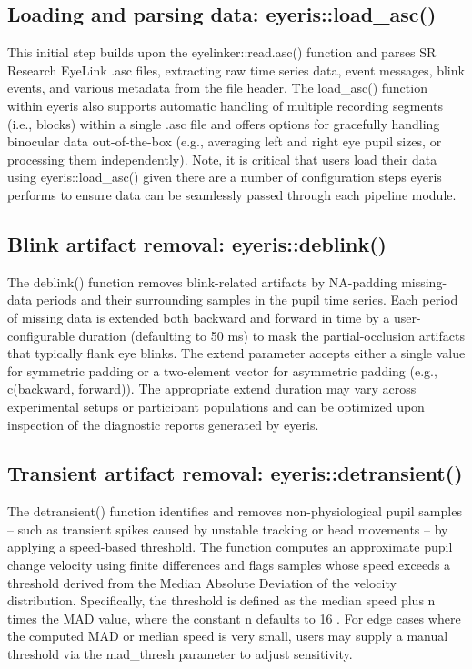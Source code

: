 \subsection{Loading and parsing data: eyeris::load\_asc()}
This initial step builds upon the eyelinker::read.asc() function and parses SR Research EyeLink .asc files, extracting raw time series data, event messages, blink events, and various metadata from the file header. The load\_asc() function within eyeris also supports automatic handling of multiple recording segments (i.e., blocks) within a single .asc file and offers options for gracefully handling binocular data out-of-the-box (e.g., averaging left and right eye pupil sizes, or processing them independently). Note, it is critical that users load their data using eyeris::load\_asc() given there are a number of configuration steps eyeris performs to ensure data can be seamlessly passed through each pipeline module.

\subsection{Blink artifact removal: eyeris::deblink()}
The deblink() function removes blink-related artifacts by NA-padding missing-data periods and their surrounding samples in the pupil time series. Each period of missing data is extended both backward and forward in time by a user-configurable duration (defaulting to 50 ms) to mask the partial-occlusion artifacts that typically flank eye blinks. The extend parameter accepts either a single value for symmetric padding or a two-element vector for asymmetric padding (e.g., c(backward, forward)). The appropriate extend duration may vary across experimental setups or participant populations and can be optimized upon inspection of the diagnostic reports generated by eyeris.

\subsection{Transient artifact removal: eyeris::detransient()}
The detransient() function identifies and removes non-physiological pupil samples – such as transient spikes caused by unstable tracking or head movements – by applying a speed-based threshold. The function computes an approximate pupil change velocity using finite differences and flags samples whose speed exceeds a threshold derived from the Median Absolute Deviation \parencite[MAD;][]{arachchige2024confidence,hampel1968contributions,hampel1974influence,leys2013detecting,rousseeuw1993alternatives,rousseeuw1986robust} of the velocity distribution. Specifically, the threshold is defined as the median speed plus n times the MAD value, where the constant n defaults to 16 \parencite{tsukahara2020pupillometry}. For edge cases where the computed MAD or median speed is very small, users may supply a manual threshold via the mad\_thresh parameter to adjust sensitivity.

